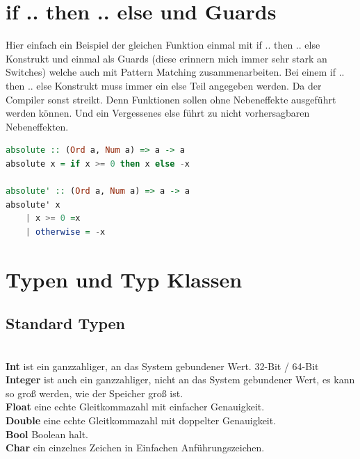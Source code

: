 \section{if .. then .. else und Guards}
Hier einfach ein Beispiel der gleichen Funktion einmal mit if .. then .. else Konstrukt und einmal als Guards (diese erinnern mich immer sehr stark an Switches) welche auch mit Pattern Matching zusammenarbeiten. Bei einem if .. then .. else Konstrukt muss immer ein else Teil angegeben werden. Da der Compiler sonst streikt. Denn Funktionen sollen ohne Nebeneffekte ausgeführt werden können. Und ein Vergessenes else führt zu nicht vorhersagbaren Nebeneffekten. 
\begin{lstlisting}[language=Haskell]  
absolute :: (Ord a, Num a) => a -> a
absolute x = if x >= 0 then x else -x

absolute' :: (Ord a, Num a) => a -> a
absolute' x 
	| x >= 0 =x
	| otherwise = -x
\end{lstlisting}
\qquad\newline

\section{Typen und Typ Klassen}
\subsection{Standard Typen}
\qquad\\
\textbf{Int} ist ein ganzzahliger, an das System gebundener Wert. 32-Bit / 64-Bit\\ 
\textbf{Integer} ist auch ein ganzzahliger, nicht an das System gebundener Wert, es kann so groß werden, wie der Speicher groß ist. \\
\textbf{Float} eine echte Gleitkommazahl mit einfacher Genauigkeit. \\
\textbf{Double} eine echte Gleitkommazahl mit doppelter Genauigkeit. \\
\textbf{Bool} Boolean halt. \\
\textbf{Char} ein einzelnes Zeichen in Einfachen Anführungszeichen. 
